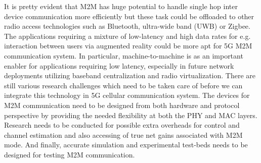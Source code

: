 It is pretty evident that M2M has huge potential to handle single hop inter device communication more efficiently but these task could be offloaded to other radio access technologies such as Bluetooth, ultra-wide band (UWB) or Zigbee. The applications requiring a mixture of low-latency and high data rates for e.g. interaction between users via augmented reality could be more apt for 5G M2M communication system. In particular, machine-to-machine is as an important enabler for applications requiring low latency, especially in future network deployments utilizing baseband centralization and radio virtualization. There are still various research challenges which need to be taken care of before we can integrate this technology in 5G cellular communication system. The devices for M2M communication need to be designed from both hardware and protocol perspective by providing the needed flexibility at both the PHY and MAC layers. Research needs to be conducted for possible extra overheads for control and channel estimation and also accessing of true net gains associated with M2M mode. And finally, accurate simulation and experimental test-beds needs to be designed for testing M2M communication.



